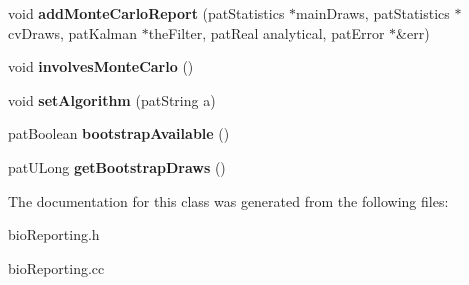 \begin{DoxyCompactItemize}
\item 
\mbox{\label{classbio_reporting_a3579366dabb93a95b16735cbaea94c9f}} 
void {\bfseries add\+Monte\+Carlo\+Report} (pat\+Statistics $\ast$main\+Draws, pat\+Statistics $\ast$cv\+Draws, pat\+Kalman $\ast$the\+Filter, pat\+Real analytical, pat\+Error $\ast$\&err)
\item 
\mbox{\label{classbio_reporting_a68939f289234a3060cb814de37a9cb5a}} 
void {\bfseries involves\+Monte\+Carlo} ()
\item 
\mbox{\label{classbio_reporting_aa1c19ac99db669ed9f9df4eaff70dea6}} 
void {\bfseries set\+Algorithm} (pat\+String a)
\item 
\mbox{\label{classbio_reporting_a63ab31f4dd91e777d9df058b9ee0d95c}} 
pat\+Boolean {\bfseries bootstrap\+Available} ()
\item 
\mbox{\label{classbio_reporting_a2b56f8d194549ca88a7a6263fe9396d5}} 
pat\+U\+Long {\bfseries get\+Bootstrap\+Draws} ()
\end{DoxyCompactItemize}


The documentation for this class was generated from the following files\+:\begin{DoxyCompactItemize}
\item 
bio\+Reporting.\+h\item 
bio\+Reporting.\+cc\end{DoxyCompactItemize}
